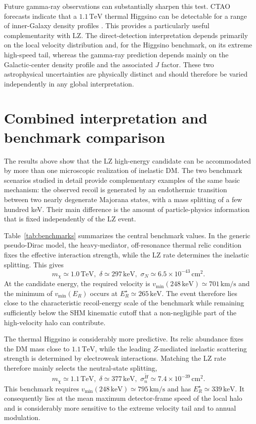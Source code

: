\documentclass[aps,prd,reprint,superscriptaddress,nofootinbib,longbibliography,floatfix]{revtex4-2}
\newcommand{\TeV}{\mathrm{TeV}}
\newcommand{\keV}{\mathrm{keV}}
\begin{document}
Future gamma-ray observations can substantially sharpen this test. CTAO forecasts indicate that a $1.1\,\TeV$ thermal Higgsino can be detectable for a range of inner-Galaxy density profiles \cite{CTAO2026Higgsino,Rodd2024}. This provides a particularly useful complementarity with LZ. The direct-detection interpretation depends primarily on the local velocity distribution and, for the Higgsino benchmark, on its extreme high-speed tail, whereas the gamma-ray prediction depends mainly on the Galactic-center density profile and the associated $J$ factor. These two astrophysical uncertainties are physically distinct and should therefore be varied independently in any global interpretation.



\section{Combined interpretation and benchmark comparison}

The results above show that the LZ high-energy candidate can be accommodated by more than one microscopic realization of inelastic DM. The two benchmark scenarios studied in detail provide complementary examples of the same basic mechanism: the observed recoil is generated by an endothermic transition between two nearly degenerate Majorana states, with a mass splitting of a few hundred keV. Their main difference is the amount of particle-physics information that is fixed independently of the LZ event.

Table~\ref{tab:benchmarks} summarizes the central benchmark values. In the generic pseudo-Dirac model, the heavy-mediator, off-resonance thermal relic condition fixes the effective interaction strength, while the LZ rate determines the inelastic splitting. This gives
\begin{equation}
m_\chi\simeq1.0\,\TeV,\,\,
\delta\simeq297\,\keV,\,\,
\sigma_N\simeq6.5\times10^{-43}\,\mathrm{cm}^2.
\end{equation}
At the candidate energy, the required velocity is $v_{\min}(248\,\keV)\simeq701\,\mathrm{km/s}$ and the minimum of $v_{\min}(E_R)$ occurs at $E_R^\star\simeq265\,\keV$. The event therefore lies close to the characteristic recoil-energy scale of the benchmark while remaining sufficiently below the SHM kinematic cutoff that a non-negligible part of the high-velocity halo can contribute.

The thermal Higgsino is considerably more predictive. Its relic abundance fixes the DM mass close to $1.1\,\TeV$, while the leading $Z$-mediated inelastic scattering strength is determined by electroweak interactions. Matching the LZ rate therefore mainly selects the neutral-state splitting,
\begin{equation}
m_\chi\simeq1.1\,\TeV,\,\,
\delta\simeq377\,\keV,\,\,
\sigma_n^{\widetilde H}\simeq7.4\times10^{-39}\,\mathrm{cm}^2.
\end{equation}
This benchmark requires $v_{\min}(248\,\keV)\simeq795\,\mathrm{km/s}$ and has $E_R^\star\simeq339\,\keV$. It consequently lies at the mean maximum detector-frame speed of the local halo and is considerably more sensitive to the extreme velocity tail and to annual modulation.
\end{document}
